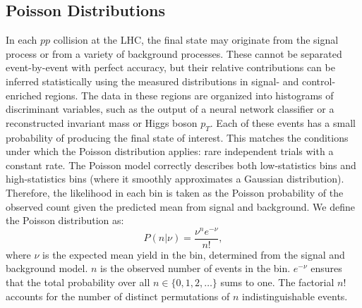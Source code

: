 \subsection{Poisson Distributions}
In each $pp$ collision at the LHC, the final state may originate from the signal process or from a variety of background processes. These cannot be separated event-by-event with perfect accuracy, but their relative contributions can be inferred statistically using the measured distributions in signal- and control-enriched regions. The data in these regions are organized into histograms of discriminant variables, such as the output of a neural network classifier or a reconstructed invariant mass or Higgs boson $p_T$. Each of these events has a small probability of producing the final state of interest. This matches the conditions under which the Poisson distribution applies: rare independent trials with a constant rate. The Poisson model correctly describes both low-statistics bins and high-statistics bins (where it smoothly approximates a Gaussian distribution). Therefore, the likelihood in each bin is taken as the Poisson probability of the observed count given the predicted mean from signal and background. We define the Poisson distribution as:
\begin{equation}
P(n |\nu) = \frac{\nu^n e^{-\nu}}{n!},
\end{equation}
where $\nu$ is the expected mean yield in the bin, determined from the signal and background model.  $n$ is the observed number of events in the bin. $e^{-\nu}$ ensures that the total probability over all $n \in \{0,1,2,\dots\}$ sums to one. The factorial $n!$ accounts for the number of distinct permutations of $n$ indistinguishable events.
